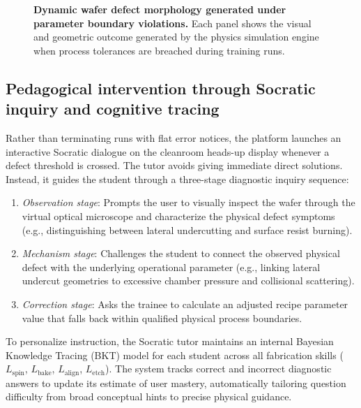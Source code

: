 \documentclass[10pt,a4paper,twocolumn]{article}
\begin{document}
\begin{figure}[!t]
\centering
{}
\caption{\textbf{Dynamic wafer defect morphology generated under parameter boundary violations.} Each panel shows the visual and geometric outcome generated by the physics simulation engine when process tolerances are breached during training runs.}
\label{fig:defects}
\end{figure}

\subsection*{Pedagogical intervention through Socratic inquiry and cognitive tracing}
Rather than terminating runs with flat error notices, the platform launches an interactive Socratic dialogue on the cleanroom heads-up display whenever a defect threshold is crossed. The tutor avoids giving immediate direct solutions. Instead, it guides the student through a three-stage diagnostic inquiry sequence:
\begin{enumerate}
    \item \textit{Observation stage}: Prompts the user to visually inspect the wafer through the virtual optical microscope and characterize the physical defect symptoms (e.g., distinguishing between lateral undercutting and surface resist burning).
    \item \textit{Mechanism stage}: Challenges the student to connect the observed physical defect with the underlying operational parameter (e.g., linking lateral undercut geometries to excessive chamber pressure and collisional scattering).
    \item \textit{Correction stage}: Asks the trainee to calculate an adjusted recipe parameter value that falls back within qualified physical process boundaries.
\end{enumerate}

To personalize instruction, the Socratic tutor maintains an internal Bayesian Knowledge Tracing (BKT) model for each student across all fabrication skills ($L_{\text{spin}}$, $L_{\text{bake}}$, $L_{\text{align}}$, $L_{\text{etch}}$). The system tracks correct and incorrect diagnostic answers to update its estimate of user mastery, automatically tailoring question difficulty from broad conceptual hints to precise physical guidance.
\end{document}
